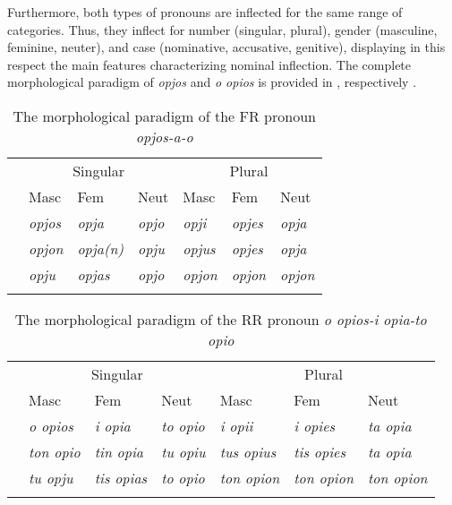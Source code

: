 \documentclass[output=paper]{langsci/langscibook}
\begin{document}
Furthermore, both types of pronouns are inflected for the same range of
categories. Thus, they inflect for number (singular, plural), gender
(masculine, feminine, neuter), and case (nominative, accusative,
genitive), displaying in this respect the main features
characterizing  nominal inflection. The complete morphological
paradigm of \emph{opjos} and \emph{o opios} is provided in
, respectively \parencite[100]{HolMacPhiWar2004}.

\begin{table}
\caption{The morphological paradigm of the \gls{FR} pronoun
\emph{opjos-a-o}}\label{tab:key:1}
\begin{tabularx}{\textwidth}{XXXXXXX}
\lsptoprule
           & \multicolumn{3}{c}{Singular}                & \multicolumn{3}{c}{Plural}  \\
           & Masc         & Fem            & Neut        & Masc         & Fem          & Neut\\
\midrule
\Nom{}     & \emph{opjos} & \emph{opja}    & \emph{opjo} & \emph{opji}  & \emph{opjes} & \emph{opja}\\
\Acc{}     & \emph{opjon} & \emph{opja(n)} & \emph{opju} & \emph{opjus} &
\emph{opjes} & \emph{opja}\\
\Gen{}     & \emph{opju}  & \emph{opjas}   & \emph{opjo} & \emph{opjon} &
\emph{opjon} & \emph{opjon}\\
\lspbottomrule
\end{tabularx}
\end{table}

\begin{table}[htpb]
\caption{The morphological paradigm of the \gls{RR} pronoun \emph{o opios-i
opia-to opio}}\label{tab:key:2}
\begin{tabularx}{\textwidth}{XXXXXXX}
\lsptoprule
            & \multicolumn{3}{c}{Singular}                & \multicolumn{3}{c}{Plural}  \\
            & Masc            & Fem              & Neut           & Masc             & Fem              & Neut\\
\midrule
\Nom{}      & \emph{o opios}  & \emph{i opia}    & \emph{to opio} & \emph{i opii}    & \emph{i opies}   & \emph{ta opia}\\
\Acc{}      & \emph{ton opio} & \emph{tin opia}  & \emph{tu opiu} & \emph{tus opius} & \emph{tis opies} & \emph{ta opia}\\
\Gen{}      & \emph{tu opju}  & \emph{tis opias} & \emph{to opio} & \emph{ton opion} & \emph{ton opion} & \emph{ton opion}\\
\lspbottomrule
\end{tabularx}
\end{table}
\end{document}
